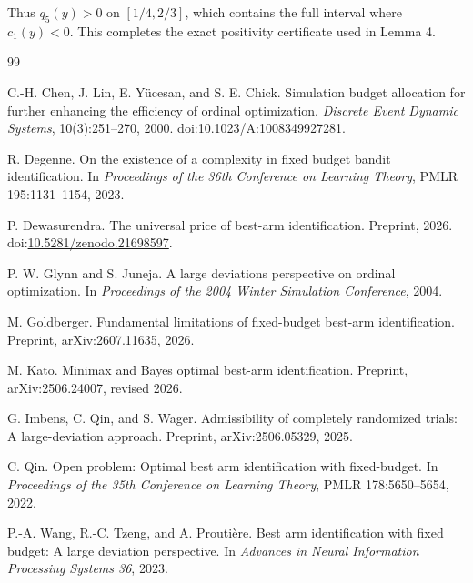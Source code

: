 \documentclass[11pt]{article}
\theoremstyle{definition}
\theoremstyle{remark}
\begin{document}
Thus $q_5(y)>0$ on $[1/4,2/3]$, which contains the full interval where $c_1(y)<0$. This completes the exact positivity certificate used in Lemma 4.

\begin{thebibliography}{99}

C.-H. Chen, J. Lin, E. Y\"ucesan, and S. E. Chick.
Simulation budget allocation for further enhancing the efficiency of ordinal optimization.
\emph{Discrete Event Dynamic Systems}, 10(3):251--270, 2000.
doi:10.1023/A:1008349927281.

R. Degenne.
On the existence of a complexity in fixed budget bandit identification.
In \emph{Proceedings of the 36th Conference on Learning Theory}, PMLR 195:1131--1154, 2023.

P. Dewasurendra.
The universal price of best-arm identification.
Preprint, 2026.
doi:\href{https://doi.org/10.5281/zenodo.21698597}{10.5281/zenodo.21698597}.

P. W. Glynn and S. Juneja.
A large deviations perspective on ordinal optimization.
In \emph{Proceedings of the 2004 Winter Simulation Conference}, 2004.

M. Goldberger.
Fundamental limitations of fixed-budget best-arm identification.
Preprint, arXiv:2607.11635, 2026.

M. Kato.
Minimax and Bayes optimal best-arm identification.
Preprint, arXiv:2506.24007, revised 2026.

G. Imbens, C. Qin, and S. Wager.
Admissibility of completely randomized trials: A large-deviation approach.
Preprint, arXiv:2506.05329, 2025.

C. Qin.
Open problem: Optimal best arm identification with fixed-budget.
In \emph{Proceedings of the 35th Conference on Learning Theory}, PMLR 178:5650--5654, 2022.

P.-A. Wang, R.-C. Tzeng, and A. Prouti\`ere.
Best arm identification with fixed budget: A large deviation perspective.
In \emph{Advances in Neural Information Processing Systems 36}, 2023.

\end{thebibliography}
\end{document}
